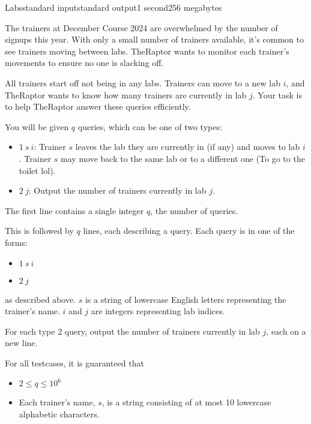 \begin{problem}{Labs}{standard input}{standard output}{1 second}{256 megabytes}

The trainers at December Course 2024 are overwhelmed by the number of signups this year. With only a small number of trainers available, it's common to see trainers moving between labs. TheRaptor wants to monitor each trainer's movements to ensure no one is slacking off.

All trainers start off not being in any labs. Trainers can move to a new lab $i$, and TheRaptor wants to know how many trainers are currently in lab $j$. Your task is to help TheRaptor answer these queries efficiently.

You will be given $q$ queries, which can be one of two types:

\begin{itemize}
\item $1\ s\ i$: Trainer $s$ leaves the lab they are currently in (if any) and moves to lab $i$. Trainer $s$ may move back to the same lab or to a different one (To go to the toilet lol).

\item $2\ j$: Output the number of trainers currently in lab $j$.
\end{itemize}

\InputFile
The first line contains a single integer $q$, the number of queries.

This is followed by $q$ lines, each describing a query. Each query is in one of the forms:

\begin{itemize}
\item $1\ s\ i$

\item $2\ j$
\end{itemize}

as described above. $s$ is a string of lowercase English letters representing the trainer's name. $i$ and $j$ are integers representing lab indices.

\OutputFile
For each type $2$ query, output the number of trainers currently in lab $j$, each on a new line.

\Scoring
For all testcases, it is guaranteed that
 
\begin{itemize}
\item $2 \leq q \leq 10^6$

\item Each trainer's name, $s$, is a string consisting of at most 10 lowercase alphabetic characters.


\end{itemize}
\end{problem}
